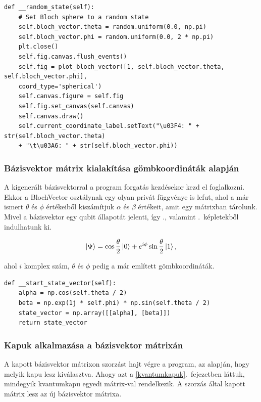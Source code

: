 \documentclass[
]{thesis-ekf}
\theoremstyle{definition}
\theoremstyle{remark}
\begin{document}
\begin{lstlisting}[caption={Véletlenszerű bázisvektor generálása és Bloch gömb rajzolása}]
def __random_state(self):
	# Set Bloch sphere to a random state
	self.bloch_vector.theta = random.uniform(0.0, np.pi)
	self.bloch_vector.phi = random.uniform(0.0, 2 * np.pi)
	plt.close()
	self.fig.canvas.flush_events()
	self.fig = plot_bloch_vector([1, self.bloch_vector.theta, self.bloch_vector.phi],
	coord_type='spherical')
	self.canvas.figure = self.fig
	self.fig.set_canvas(self.canvas)
	self.canvas.draw()
	self.current_coordinate_label.setText("\u03F4: " + str(self.bloch_vector.theta)
	+ "\t\u03A6: " + str(self.bloch_vector.phi))
\end{lstlisting}


\subsubsection{Bázisvektor mátrix kialakítása gömbkoordináták alapján}
A kigenerált bázisvektorral a program forgatás kezdésekor kezd el foglalkozni. Ekkor a BlochVector osztálynak egy olyan privát függvénye is lefut, ahol a már ismert $\theta$ és $\phi$ értékeiből kiszámítjuk $\alpha$ és $\beta$ értékeit, amit egy mátrixban tárolunk. Mivel a bázisvektor egy qubit állapotát jelenti, így \az{\ref{qubitallapot}}., valamint \az{\ref{qubitallapothelyettesit}}.~képletekből indulhatunk ki.

\begin{equation}\label{qubitallapothelyettesit}
	\ket{\Psi}=\cos\frac{\theta}{2}\ket{0}+e^{i\phi}\sin\frac{\theta}{2}\ket{1},
\end{equation}

ahol $i$ komplex szám, $\theta$ és $\phi$ pedig a már említett gömbkoordináták.

\begin{lstlisting}[caption={Bázisvektor mátrix kialakítása a képletek alapján}]
def __start_state_vector(self):
	alpha = np.cos(self.theta / 2)
	beta = np.exp(1j * self.phi) * np.sin(self.theta / 2)
	state_vector = np.array([[alpha], [beta]])
	return state_vector
\end{lstlisting}

\subsubsection{Kapuk alkalmazása a bázisvektor mátrixán}
A kapott bázisvektor mátrixon szorzást hajt végre a program, az alapján, hogy melyik kapu lesz kiválasztva. Ahogy azt a \ref{kvantumkapuk}.~fejezetben láttuk, mindegyik kvantumkapu egyedi mátrix-val rendelkezik. A szorzás által kapott mátrix lesz az új bázisvektor mátrixa.
\end{document}
